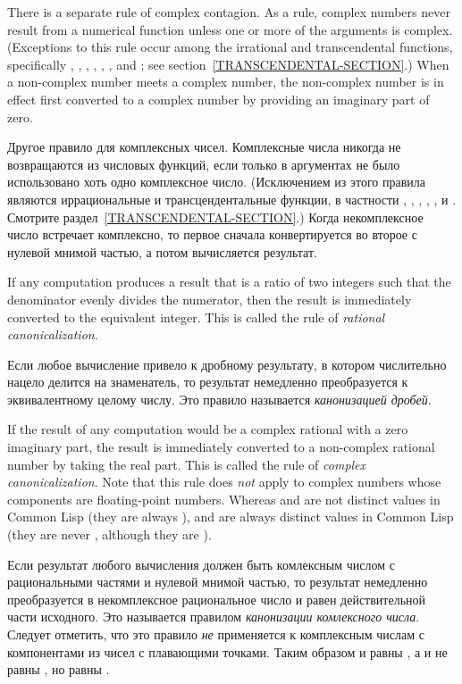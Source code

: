 There is a separate rule of complex contagion.
As a rule, complex numbers never result from a numerical function
unless one or more of the
arguments is complex.  (Exceptions to this
rule occur among the irrational and transcendental functions,
specifically , , ,
, , , and ;
see section~\ref{TRANSCENDENTAL-SECTION}.)
When a non-complex number meets a complex number, the non-complex
number is in effect first converted to a complex number by providing an
imaginary part of zero.

Другое правило для комплексных чисел.
Комплексные числа никогда не возвращаются из числовых функций, если только в
аргументах не было использовано хоть одно комплексное число. (Исключением из
этого правила являются иррациональные и трансцендентальные функции, в частности
, , , , ,  и
. Смотрите раздел~\ref{TRANSCENDENTAL-SECTION}.)
Когда некомплексное число встречает комплексно, то первое сначала конвертируется
во второе с нулевой мнимой частью, а потом вычисляется результат.

If any computation produces a result that is a ratio of
two integers such that the denominator evenly divides the
numerator, then the result is immediately converted to the equivalent
integer.  This is called the rule of \emph{rational canonicalization}.

Если любое вычисление привело к дробному результату, в котором числительно
нацело делится на знаменатель, то результат немедленно преобразуется к
эквивалентному целому числу. Это правило называется \emph{канонизацией дробей}.

If the result of any computation would be a complex rational
with a zero imaginary part, the result is immediately
converted to a non-complex rational number by taking the
real part.  This is called the rule of \emph{complex canonicalization}.
Note that this rule does \emph{not} apply to complex numbers whose components
are floating-point numbers.  Whereas  and  are not
distinct values in Common Lisp (they are always ),
 and  are always distinct values in Common Lisp
(they are never , although they are ).

Если результат любого вычисления должен быть комлексным числом с рациональными
частями и нулевой мнимой частью, то результат немедленно преобразуется в
некомплексное рациональное число и равен действительной части исходного.
Это называется правилом \emph{канонизации комлексного числа}.
Следует отметить, что это правило \emph{не} применяется к комплексным числам с
компонентами из чисел с плавающими точками. Таким образом  и 
равны , а  и  не равны , но равны
.

